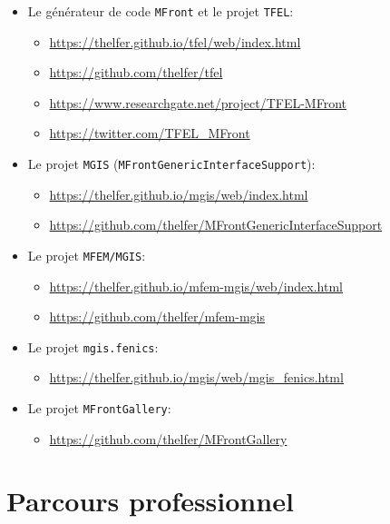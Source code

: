 \begin{itemize}
  \item Le générateur de code \texttt{MFront} et le projet \texttt{TFEL}:
  \begin{itemize}
    \item \url{https://thelfer.github.io/tfel/web/index.html}
    \item \url{https://github.com/thelfer/tfel}
    \item \url{https://www.researchgate.net/project/TFEL-MFront}
    \item \url{https://twitter.com/TFEL_MFront}
  \end{itemize}
  \item Le projet \texttt{MGIS} (\texttt{MFrontGenericInterfaceSupport}):
  \begin{itemize}
    \item \url{https://thelfer.github.io/mgis/web/index.html}
    \item \url{https://github.com/thelfer/MFrontGenericInterfaceSupport}
  \end{itemize}
  \item Le projet \texttt{MFEM/MGIS}:
  \begin{itemize}
    \item \url{https://thelfer.github.io/mfem-mgis/web/index.html}
    \item \url{https://github.com/thelfer/mfem-mgis}
  \end{itemize}
  \item Le projet \texttt{mgis.fenics}:
  \begin{itemize}
    \item \url{https://thelfer.github.io/mgis/web/mgis_fenics.html}
  \end{itemize}
  \item Le projet \texttt{MFrontGallery}:
  \begin{itemize}
    \item \url{https://github.com/thelfer/MFrontGallery}
  \end{itemize}
\end{itemize}

\section{Parcours professionnel}

